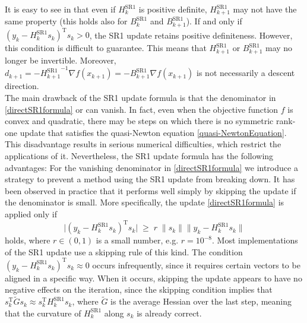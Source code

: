 It is easy to see in that even if $H^\mathrm{SR1}_k$ is positive definite, $H^\mathrm{SR1}_{k+1}$ may not have the same property (this holds also for $B^\mathrm{SR1}_k$ and $B^\mathrm{SR1}_{k+1}$). If and only if $(y_k - H^\mathrm{SR1}_k s_k)^{\mathrm{T}} s_k > 0$, the SR1 update retains positive definiteness. However, this condition is difficult to guarantee. This means that $H^\mathrm{SR1}_{k+1}$ or $B^\mathrm{SR1}_{k+1}$ may no longer be invertible. Moreover, $d_{k+1} = -{H^\mathrm{SR1}_{k+1}}^{-1} \nabla f(x_{k+1}) = -B^\mathrm{SR1}_{k+1} \nabla f(x_{k+1})$ is not necessarily a descent direction. \\
The main drawback of the SR1 update formula is that the denominator in \cref{directSR1formula} or   can vanish. In fact, even when the objective function $f$ is convex and quadratic, there may be steps on which there is no symmetric rank-one update that satisfies the quasi-Newton equation \cref{quasi-NewtonEquation}. This disadvantage results in serious numerical difficulties, which restrict the applications of it. Nevertheless, the SR1 update formula has the following advantages:
For the vanishing denominator in \cref{directSR1formula} we introduce a strategy to prevent a method using the SR1 update from breaking down. It has been observed in practice that it performs well simply by skipping the update if the denominator is small. More specifically, the update \cref{directSR1formula} is applied only if 
\begin{equation}
    \lvert (y_k - H^\mathrm{SR1}_k s_k)^{\mathrm{T}} s_k \lvert \; \geq \; r \; \lVert s_k \rVert \lVert y_k - H^\mathrm{SR1}_k s_k \rVert 
\end{equation}
holds, where $r \in (0, 1)$ is a small number, e.g. $r = 10^{−8}$. Most implementations of the SR1 update use a skipping rule of this kind. The condition $(y_k - H^\mathrm{SR1}_k s_k)^{\mathrm{T}} s_k \approx 0$ occurs infrequently, since it requires certain vectors to be aligned in a specific way. When it occurs, skipping the update appears to have no negative effects on the iteration, since the skipping condition implies that $s^{\mathrm{T}}_k \tilde{G} s_k \approx s^{\mathrm{T}}_k H^\mathrm{SR1}_k s_k$, where $\tilde{G}$ is the average Hessian over the last step, meaning that the curvature of $H^\mathrm{SR1}_k$ along $s_k$ is already correct. \\


